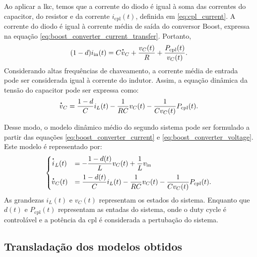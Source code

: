 Ao aplicar a \acrshort{lkc}, temos que a corrente do diodo é igual à soma das correntes do capacitor, do resistor e da corrente $i_{\mathrm{cpl}}(t)$, definida em \eqref{eq:cpl_current}. A corrente do diodo é igual à corrente média de saída do conversor Boost, expressa na equação \eqref{eq:boost_converter_current_transfer}. Portanto, \begin{equation} (1 - d) i_{\mathrm{in}}(t) = C\dt{v}_C + \frac{v_C(t)}{R} + \frac{P_{\mathrm{cpl}}(t)}{v_C(t)}.\end{equation} Considerando altas frequências de chaveamento, a corrente média de entrada pode ser considerada igual à corrente do indutor. Assim, a equação dinâmica da tensão do capacitor pode ser expressa como: \begin{equation} \dt{v}_C = \frac{1 - d}{C} i_L(t) - \frac{1}{RC}v_C(t) - \frac{1}{Cv_C(t)}P_{\mathrm{cpl}}(t). \label{eq:boost_converter_voltage}\end{equation}

Desse modo, o modelo dinâmico médio do segundo sistema pode ser formulado a partir das equações \eqref{eq:boost_converter_current} e \eqref{eq:boost_converter_voltage}. Este modelo é representado por: \begin{equation} \begin{cases} \dt{i}_L(t) &= \displaystyle - \frac{1-d(t)}{L}v_C(t) + \frac{1}{L}v_{\mathrm{in}} \\[8pt] \dt{v}_C(t) &= \displaystyle \frac{1 - d(t)}{C} i_L(t) - \frac{1}{RC}v_C(t) - \frac{1}{Cv_C(t)}P_{\mathrm{cpl}}(t). \label{eq:boost_nonlinear_system}\end{cases} \end{equation} As grandezas $i_L(t)$ e $v_C(t)$ representam os estados do sistema. Enquanto que $d(t)$ e $P_{\mathrm{cpl}}(t)$ representam as entadas do sistema, onde o duty cycle é controlável e a potência da \acrshort{cpl} é considerada a pertubação do sistema.

\subsection{Transladação dos modelos obtidos}


